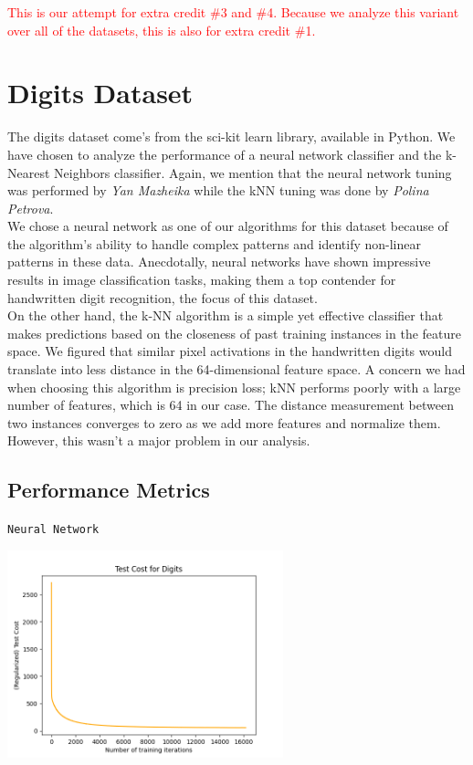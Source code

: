 \documentclass{article}
\begin{document}
\textcolor{red}{This is our attempt for extra credit \#3 and \#4. Because we analyze this variant over all of the datasets, this is also for extra credit \#1.}


\newpage
\section*{Digits Dataset}

The digits dataset come's from the sci-kit learn library, available in Python. We have chosen to analyze the performance of a neural network classifier and the k-Nearest Neighbors classifier. Again, we mention
that the neural network tuning was performed by \textit{Yan Mazheika} while the kNN tuning was done by \textit{Polina Petrova}.
\\

We chose a neural network as one of our algorithms for this dataset because of the algorithm's ability to
handle complex patterns and identify non-linear patterns in these data. Anecdotally, neural networks have shown
impressive results in image classification tasks, making them a top contender for handwritten digit recognition, the focus of this dataset.
\\

On the other hand, the k-NN algorithm is a simple yet effective classifier that makes predictions based on the closeness of past training instances in the feature space. We figured that similar pixel activations in the handwritten digits
would translate into less distance in the 64-dimensional feature space. A concern we had when choosing this algorithm is precision loss; kNN performs poorly with a large number of features, which is 64 in our case. The distance measurement between two instances
converges to zero as we add more features and normalize them. However, this wasn't a major problem in our analysis.

\subsection*{Performance Metrics}
\begin{center}
    \texttt{Neural Network}

    \includegraphics*[width=0.6\textwidth]{./src/figures/Digits-test-cost.png}
\end{center}
\end{document}
